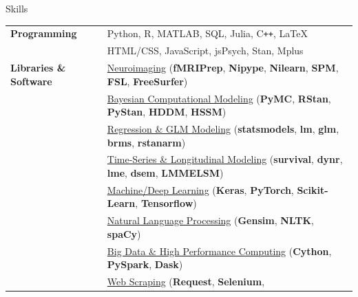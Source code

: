 \documentclass{resume} %
\begin{document}
\begin{rSection}{Skills}

\begin{tabular}{ @{} >{\bfseries}l @{\hspace{6ex}} l }
Programming & Python, R, MATLAB, SQL, Julia, C\texttt{++}, \LaTeX \\[1ex]
            & HTML/CSS, JavaScript, jsPsych, Stan, Mplus \\[1.5ex]
Libraries \& Software  & \underline{Neuroimaging} (\textbf{fMRIPrep}, \textbf{Nipype}, 
                                                   \textbf{Nilearn}, \textbf{SPM}, 
                                                   \textbf{FSL}, \textbf{FreeSurfer}) \\[1ex] 
                       & \underline{Bayesian Computational Modeling} (\textbf{PyMC}, \textbf{RStan},      
                                                                      \textbf{PyStan}, \textbf{HDDM}, \textbf{HSSM}) \\[1ex]
                       & \underline{Regression \& GLM Modeling} (\textbf{statsmodels}, \textbf{lm}, 
                                                                 \textbf{glm}, \textbf{brms}, \textbf{rstanarm}) \\[1ex]
                       & \underline{Time-Series \& Longitudinal Modeling} (\textbf{survival}, \textbf{dynr},
                                                                           \textbf{lme}, \textbf{dsem}, \textbf{LMMELSM}) \\[1ex]  
                       & \underline{Machine/Deep Learning} (\textbf{Keras}, \textbf{PyTorch}, 
                                                            \textbf{Scikit-Learn}, 
                                                            \textbf{Tensorflow}) \\[1ex]
                       & \underline{Natural Language Processing} (\textbf{Gensim}, \textbf{NLTK}, 
                                                                  \textbf{spaCy}) \\[1ex]
                       & \underline{Big Data \& High Performance Computing} (\textbf{Cython}, 
                                                                             \textbf{PySpark},              \textbf{Dask}) \\[1ex]
                       & \underline{Web Scraping} (\textbf{Request}, \textbf{Selenium}, 

\end{tabular}
\end{rSection}
\end{document}
